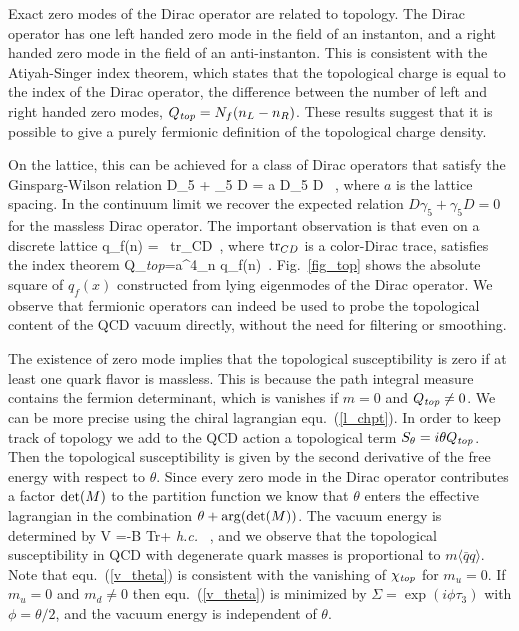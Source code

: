 Exact zero modes of the Dirac operator are related to topology. The 
Dirac operator has one left handed zero mode in the field of an instanton, 
and a right handed zero mode in the field of an anti-instanton. This 
is consistent with the Atiyah-Singer index theorem, which states that 
the topological charge is equal to the index of the Dirac operator, the 
difference between the number of left and right handed zero modes,
$Q_{\it top}=N_f(n_L-n_R)$. These results suggest that it is possible 
to give a purely fermionic definition of the topological charge density. 

 On the lattice, this can be achieved for a class of Dirac operators
that satisfy the Ginsparg-Wilson relation \cite{Ginsparg:1981bj}
\be 
 D\gamma_5 + \gamma_5 D = a D\gamma_5 D \, , 
\ee
where $a$ is the lattice spacing. In the continuum limit we recover
the expected relation $ D\gamma_5 + \gamma_5 D =0$ for the massless
Dirac operator. The important observation is that even on a discrete
lattice
\be 
\label{q_ferm}
q_f(n) = \, {\rm tr}_{CD} \, ,
\ee
where ${\rm tr}_{CD}$ is a color-Dirac trace, satisfies the index
theorem 
\be 
 Q_{\it top}=a^4\sum_n \; q_f(n)\, . 
\ee
Fig.~\ref{fig_top} shows the absolute square of $q_f(x)$ constructed 
from lying eigenmodes of the Dirac operator. We observe that 
fermionic operators can indeed be used to probe the topological content 
of the QCD vacuum directly, without the need for filtering or smoothing.

 The existence of zero mode implies that the topological susceptibility 
is zero if at least one quark flavor is massless. This is because the
path integral measure contains the fermion determinant, which is 
vanishes if $m=0$ and $Q_{\it top}\neq 0$. We can be more precise 
using the chiral lagrangian equ.~(\ref{l_chpt}). In order to keep 
track of topology we add to the QCD action a topological term 
$S_\theta = i\theta Q_{\it top}$. Then the topological susceptibility 
is given by the second derivative of the free energy with respect 
to $\theta$. Since every zero mode in the Dirac operator contributes 
a factor ${\rm det}(M)$ to the partition function we know that 
$\theta$ enters the effective lagrangian in the combination $\theta
+{\rm arg}(\det(M))$. The vacuum energy is determined by 
\be 
\label{v_theta}
 V =-B {\rm Tr} + {\it h.c.} \, , 
\ee
and we observe that the topological susceptibility in QCD with degenerate
quark masses is proportional to $m\langle\bar{q}q\rangle$. Note that 
equ.~(\ref{v_theta}) is consistent with the vanishing of $\chi_{\it top}$ 
for $m_u=0$. If $m_u=0$ and $m_d\neq 0$ then equ.~(\ref{v_theta}) is 
minimized by $\Sigma=\exp(i\phi\tau_3)$ with $\phi=\theta/2$, and the 
vacuum energy is independent of $\theta$.   

